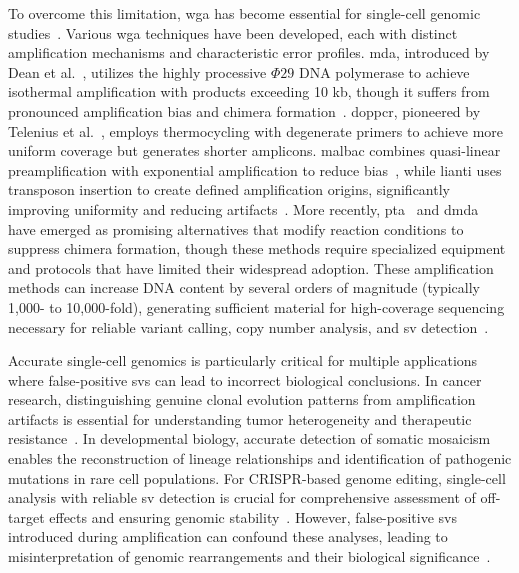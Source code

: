 \documentclass[pdflatex,sn-nature,lineno]{sn-jnl}%
\theoremstyle{thmstyleone}%
\theoremstyle{thmstyletwo}%
\theoremstyle{thmstylethree}%
\begin{document}
To overcome this limitation, \gls{wga} has become essential for single-cell genomic studies~\cite{zong2012genome,huang2015single,dean2002comprehensive, chen2017singlecell,macaulay2014single}.
Various \gls{wga} techniques have been developed, each with distinct amplification mechanisms and characteristic error profiles.
\gls{mda}, introduced by Dean et al.~\cite{dean2002comprehensive}, utilizes the highly processive $\Phi29$ DNA polymerase to achieve isothermal amplification with products exceeding 10 kb, though it suffers from pronounced amplification bias and chimera formation~\cite{lasken2007mechanism,pinard2006assessment}.
\gls{doppcr}, pioneered by Telenius et al.~\cite{telenius1992degenerate}, employs thermocycling with degenerate primers to achieve more uniform coverage but generates shorter amplicons.
\gls{malbac} combines quasi-linear preamplification with exponential amplification to reduce bias~\cite{zong2012genome}, while \gls{lianti} uses transposon insertion to create defined amplification origins, significantly improving uniformity and reducing artifacts~\cite{chen2017singlecell}.
More recently, \gls{pta}~\cite{gonzalez-pena2021accurate} and \gls{dmda}~\cite{hard2023longread,  dippenaar2024droplet} have emerged as promising alternatives that modify reaction conditions to suppress chimera formation, though these methods require specialized equipment and protocols that have limited their widespread adoption.
These amplification methods can increase DNA content by several orders of magnitude (typically 1,000- to 10,000-fold), generating sufficient material for high-coverage sequencing necessary for reliable variant calling, copy number analysis, and \gls{sv} detection~\cite{macaulay2014single,de2014quantitative, biezuner2021comparison,fu2015uniform,agyabeng2025evaluating,dean2001rapid}.

Accurate single-cell genomics is particularly critical for multiple applications where false-positive \glspl{sv} can lead to incorrect biological conclusions.
In cancer research, distinguishing genuine clonal evolution patterns from amplification artifacts is essential for understanding tumor heterogeneity and therapeutic resistance~\cite{navin2011tumour}.
In developmental biology, accurate detection of somatic mosaicism enables the reconstruction of lineage relationships and identification of pathogenic mutations in rare cell populations.
For CRISPR-based genome editing, single-cell analysis with reliable \gls{sv} detection is crucial for comprehensive assessment of off-target effects and ensuring genomic stability~\cite{gonzalez-pena2021accurate}.
However, false-positive \glspl{sv} introduced during amplification can confound these analyses, leading to misinterpretation of genomic rearrangements and their biological significance~\cite{macaulay2014single,lu2023chimera}.
\end{document}
